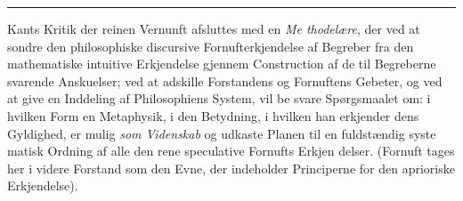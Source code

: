 \documentclass[12pt,a4paper]{book}
\newcommand{\divrule}{\begin{center}\rule{2cm}{0.4pt}\end{center}}
\begin{document}
\divrule
%
%

Kants Kritik der reinen Vernunft afsluttes med en \emph{Me\-%
thodelære}, der ved at sondre den philosophiske discursive
Fornufterkjendelse af Begreber fra den mathematiske intuitive
Erkjendelse gjennem Construction af de til Begreberne svarende
Anskuelser; ved at adskille Forstandens og Fornuftens Gebeter,
og ved at give en Inddeling af Philosophiens System, vil be\-%
svare Spørgsmaalet om: i hvilken Form en Metaphysik, i den
Betydning, i hvilken han erkjender dens Gyldighed, er mulig
\emph{som Videnskab} og udkaste Planen til en fuldstændig syste\-%
matisk Ordning af alle den rene speculative Fornufts Erkjen\-%
delser. (Fornuft tages her i videre Forstand som den Evne,
der indeholder Principerne for den aprioriske Erkjendelse).
\end{document}
